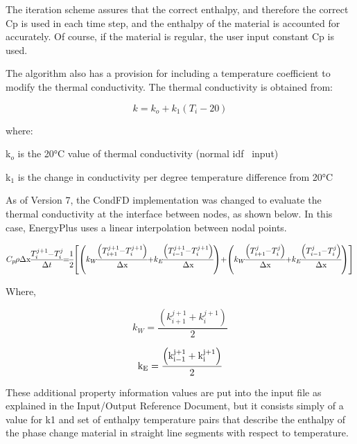 The iteration scheme assures that the correct enthalpy, and therefore the correct Cp is used in each time step, and the enthalpy of the material is accounted for accurately. Of course, if the material is regular, the user input constant Cp is used.

The algorithm also has a provision for including a temperature coefficient to modify the thermal conductivity. The thermal conductivity is obtained from:

\begin{equation}
k = {k_o} + {k_1}\left( {{T_i} - 20} \right)
\end{equation}

where:

k\(_{o}\) is the 20°C value of thermal conductivity (normal idf~ input)

k\(_{1}\) is the change in conductivity per degree temperature difference from 20°C

As of Version 7, the CondFD implementation was changed to evaluate the thermal conductivity at the interface between nodes, as shown below. In this case, EnergyPlus uses a linear interpolation between nodal points.

\begin{equation}
\medmuskip=0mu
\thinmuskip=0mu
\thickmuskip=0mu
\nulldelimiterspace=0pt
\scriptspace=0pt
{C_p}\rho {\rm{\Delta x}}\frac{{T_i^{j + 1} - T_i^j}}{{{\rm{\Delta }}t}} = \frac{1}{2}\left[ {\left( {{k_W}\frac{{\left( {T_{i + 1}^{j + 1} - T_i^{j + 1}} \right)}}{{{\rm{\Delta x}}}} + {k_E}\frac{{\left( {T_{i - 1}^{j + 1} - T_i^{j + 1}} \right)}}{{{\rm{\Delta x}}}}} \right) + \left( {{k_W}\frac{{\left( {T_{i + 1}^j - T_i^j} \right)}}{{{\rm{\Delta x}}}} + {k_E}\frac{{\left( {T_{i - 1}^j - T_i^j} \right)}}{{{\rm{\Delta x}}}}} \right)} \right]
\end{equation}

Where,

\begin{equation}
{k_W} = \frac{{\left( {k_{i + 1}^{j + 1} + k_i^{j + 1}} \right)}}{2}
\end{equation}

\begin{equation}
{{\rm{k}}_{\rm{E}}} = \frac{{\left( {{\rm{k}}_{{\rm{i}} - 1}^{{\rm{j}} + 1} + {\rm{k}}_{\rm{i}}^{{\rm{j}} + 1}} \right)}}{2}
\end{equation}

These additional property information values are put into the input file as explained in the Input/Output Reference Document, but it consists simply of a value for k1 and set of enthalpy temperature pairs that describe the enthalpy of the phase change material in straight line segments with respect to temperature.

